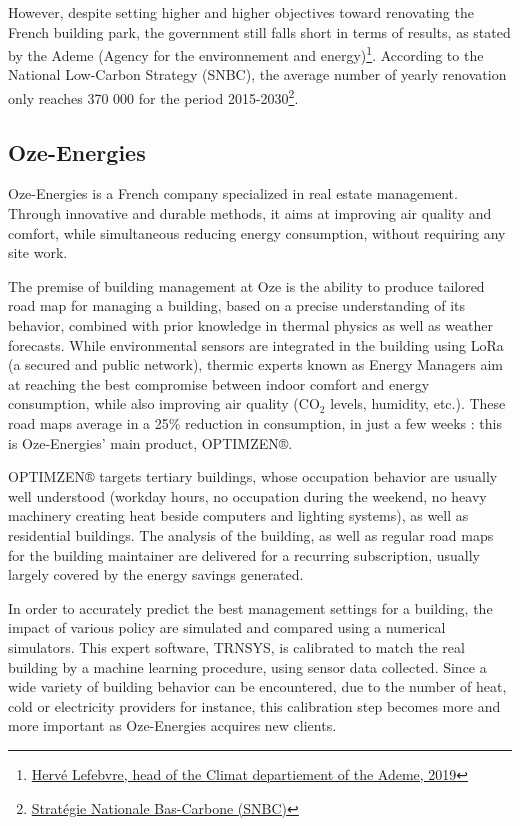 \documentclass[12pt]{article}
\begin{document}
However, despite setting higher and higher objectives toward renovating the French building park, the government still falls short in terms of results, as stated by the Ademe (Agency for the environnement and energy)\footnote{\href{https://www.lefigaro.fr/conjoncture/accord-de-paris-pourquoi-les-pays-ne-sont-pas-a-la-hauteur-de-leurs-engagements-20190419}{Hervé Lefebvre, head of the Climat departiement of the Ademe, 2019}}. According to the National Low-Carbon Strategy (SNBC), the average number of yearly renovation only reaches 370 000 for the period 2015-2030\footnote{\href{https://www.ecologie.gouv.fr/strategie-nationale-bas-carbone-snbc}{Stratégie Nationale Bas-Carbone (SNBC)}}.

\subsection{Oze-Energies}

Oze-Energies is a French company specialized in real estate management. Through innovative and durable methods, it aims at improving air quality and comfort, while simultaneous reducing energy consumption, without requiring any site work.

The premise of building management at Oze is the ability to produce tailored road map for managing a building, based on a precise understanding of its behavior, combined with prior knowledge in thermal physics as well as weather forecasts. While environmental sensors are integrated in the building using LoRa (a secured and public network), thermic experts known as Energy Managers aim at reaching the best compromise between indoor comfort and energy consumption, while also improving air quality (\ensuremath{\mathrm{CO_2}} levels, humidity, etc.). These road maps average in a 25\% reduction in consumption, in just a few weeks : this is Oze-Energies' main product, OPTIMZEN®.

OPTIMZEN® targets tertiary buildings, whose occupation behavior are usually well understood (workday hours, no occupation during the weekend, no heavy machinery creating heat beside computers and lighting systems), as well as residential buildings. The analysis of the building, as well as regular road maps for the building maintainer are delivered for a recurring subscription, usually largely covered by the energy savings generated.

In order to accurately predict the best management settings for a building, the impact of various policy are simulated and compared using a numerical simulators. This expert software, TRNSYS, is calibrated to match the real building by a machine learning procedure, using sensor data collected. Since a wide variety of building behavior can be encountered, due to the number of heat, cold or electricity providers for instance, this calibration step becomes more and more important as Oze-Energies acquires new clients.
\end{document}
